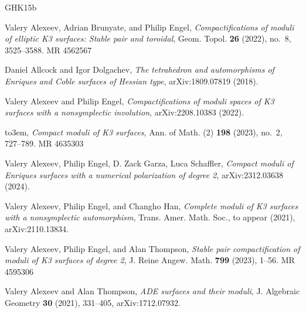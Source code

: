 \documentclass{amsart}
\begin{document}
% 





\def\cprime{$'$}
\providecommand{\bysame}{\leavevmode\hbox to3em{\hrulefill}\thinspace}
\providecommand{\MR}{\relax\ifhmode\unskip\space\fi MR }
\providecommand{\MRhref}[2]{%
  \href{http://www.ams.org/mathscinet-getitem?mr=#1}{#2}
}

\begin{thebibliography}{GHK15b}

Valery Alexeev, Adrian Brunyate, and Philip Engel, \emph{Compactifications of
  moduli of elliptic {K}3 surfaces: {S}table pair and toroidal}, Geom. Topol.
  \textbf{26} (2022), no.~8, 3525--3588. \MR{4562567}

Daniel Allcock and Igor Dolgachev,
\emph{The tetrahedron and automorphisms of Enriques and Coble surfaces of Hessian type},
arXiv:1809.07819 (2018).

Valery Alexeev and Philip Engel, \emph{Compactifications of moduli spaces of     
  {K3} surfaces with a nonsymplectic involution}, arXiv:2208.10383 (2022).

\bysame, \emph{Compact moduli of {K}3 surfaces}, Ann. of Math. (2) \textbf{198}
  (2023), no.~2, 727--789. \MR{4635303}

  
Valery Alexeev, Philip Engel, D. Zack Garza, Luca Schaffler,
\emph{Compact moduli of Enriques surfaces with a numerical polarization of degree 2}, arXiv:2312.03638 (2024).

Valery Alexeev, Philip Engel, and Changho Han, \emph{Complete moduli of {K}3
  surfaces with a nonsymplectic automorphism}, Trans. Amer. Math. Soc., to
  appear (2021), arXiv:2110.13834.

Valery Alexeev, Philip Engel, and Alan Thompson, \emph{Stable pair
  compactification of moduli of {K}3 surfaces of degree 2}, J. Reine Angew.
  Math. \textbf{799} (2023), 1--56. \MR{4595306}

Valery Alexeev and Alan Thompson, \emph{{ADE} surfaces and their moduli}, J.
  Algebraic Geometry \textbf{30} (2021), 331--405, arXiv:1712.07932.


\end{thebibliography}
\end{document}
